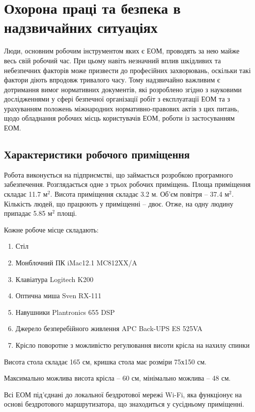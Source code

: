 \documentclass[a4paper,12pt]{article}
\begin{document}
\onehalfspacing
\large

\section{Охорона праці та безпека в надзвичайних ситуаціях}

Люди, основним робочим інструментом яких є ЕОМ, проводять за нею майже весь свій робочий час. При цьому навіть незначний вплив шкідливих та небезпечних факторів може призвести до професійних захворювань, оскільки такі фактори діють впродовж тривалого часу. Тому надзвичайно важливим є дотримання вимог нормативних документів, які розроблено згідно з  науковими дослідженнями у сфері безпечної організації робіт з експлуатації ЕОМ та з урахуванням положень міжнародних нормативно-правових актів з цих питань, щодо обладнання робочих місць користувачів ЕОМ, роботи із застосуванням ЕОМ.

\subsection{Характеристики робочого приміщення}
Робота виконується на підприємстві, що займається розробкою програмного забезпечення. Розглядається одне з трьох робочих приміщень. Площа приміщення складає 11.7 $\text{м}^2$. Висота приміщення складає 3.2 м. Об’єм повітря -- 37.4 $\text{м}^2$. Кількість людей, що працюють у приміщенні -- двоє. Отже, на одну людину припадає 5.85 $\text{м}^2$ площі.

Кожне робоче місце складають:
\begin{enumerate}
\item Стіл
\item Монблочний ПК iMac12.1 MC812XX/A
\item Клавіатура Logitech K200
\item Оптична миша Sven RX-111
\item Навушники Plantronics 655 DSP
\item Джерело безперебійного живлення APC Back-UPS ES 525VA
\item Крісло поворотне з можливістю регулювання висоти крісла на нахилу спинки
\end{enumerate}

Висота стола складає 165 см, кришка стола має розміри 75х150 см.

Максимально можлива висота крісла -- 60 см, мінімально можлива -- 48 см.

Всі ЕОМ під’єднані до локальної бездротової мережі Wi-Fi, яка функціонує на основі бездротового маршрутизатора, що знаходиться у сусідньому приміщенні.
\end{document}

